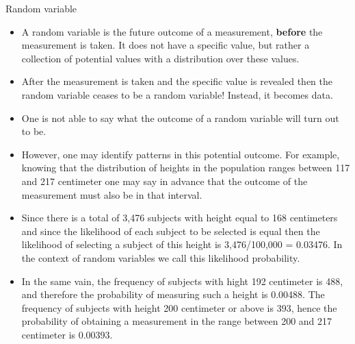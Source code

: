 \documentclass[10pt,handout]{beamer}\usepackage[]{graphicx}\usepackage[]{color}
\begin{document}
\begin{frame}[fragile]{Random variable}
	\small
	\begin{itemize}[<+->]
		
		\item A random variable is the future outcome of a measurement, \textbf{before}
		the measurement is taken. It does not have a specific value, but rather
		a collection of potential values with a distribution over these values.
		
		\item After the measurement is taken and the specific value is revealed then
		the random variable ceases to be a random variable! Instead, it becomes
		data.
		
		\item One is not able to say what the outcome of a random variable
		will turn out to be. 
		
		\item However, one may identify patterns in this potential
		outcome. For example, knowing that the distribution of heights in the
		population ranges between 117 and 217 centimeter one may say in advance
		that the outcome of the measurement must also be in that interval.
		
		\item Since there is a total of 3,476 subjects with height equal to
		168 centimeters and since the likelihood of each subject to be selected
		is equal then the likelihood of selecting a subject of this height is
		3,476/100,000 = 0.03476. In the context of random variables we call this
		likelihood probability. 
		
		\item In the same vain, the frequency of subjects
		with hight 192 centimeter is 488, and therefore the probability of
		measuring such a height is 0.00488. The frequency of subjects with
		height 200 centimeter or above is 393, hence the probability of
		obtaining a measurement in the range between 200 and 217 centimeter is
		0.00393.
		
		
	\end{itemize}
	
\end{frame}
\end{document}
